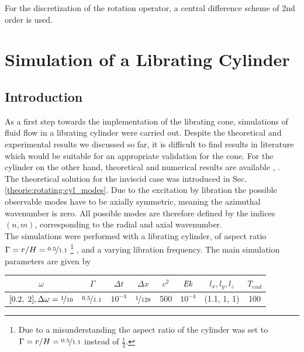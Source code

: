 For the discretization of the rotation operator, a central difference scheme of 2nd order is used.
\clearpage



\section{Simulation of a Librating Cylinder}
\subsection{Introduction}
\label{cone:sec:lib_cylinder}

As a first step towards the implementation of the librating cone, simulations of fluid flow in a librating cylinder were carried out.
Despite the theoretical and experimental results we discussed so far,
it is difficult to find results in literature which would be suitable for an appropriate validation for the cone.
For the cylinder on the other hand, theoretical and numerical results are available \citep{Greenspan1990}, \citep{Sauret2012}.\\
The theoretical solution for the inviscid case was introduced in Sec. \ref{theorie:rotating:cyl_modes}.
Due to the excitation by libration the possible observable modes have to be axially symmetric, meaning the azimuthal wavenumber is zero.
All possible modes are therefore defined by the indices $(n, m)$, corresponding to the radial and axial wavenumber.\\
The simulations were performed with a librating cylinder, of aspect ratio $\Gamma=r/H=\nicefrac{0.5}{1.1}$
\footnote{Due to a misunderstanding the aspect ratio of the cylinder was set to $\Gamma=r/H=\nicefrac{0.5}{1.1}$ instead of $\frac{1}{2}$.}
, and a varying libration frequency.
The main simulation parameters are given by


\begin{center}
\vspace*{0.7ex}
\begin{tabular}{c|c|c|c|c|c|c|c }
 $\omega $ & $\Gamma$ & $\Delta t$ & $\Delta x$ & $c^2$ & $\mbox{\textit{Ek}}$  & $l_x, l_y, l_z$ & $T_{end}$\\
\hline
 $[0.2,\; 2], \Delta \omega = \nicefrac{1}{10}$ & $\nicefrac{0.5}{1.1}$ & $10^{-4}$ & $\nicefrac{1}{128}$ & 500 & $10^{-4}$  & (1.1, 1, 1) & 100\\
\end{tabular}
\vspace*{0.7ex}
\end{center}

